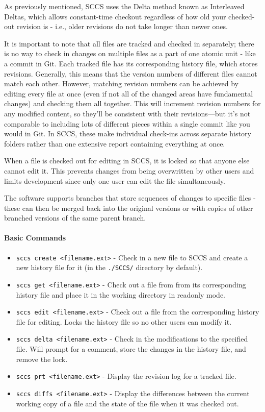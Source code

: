 As previously mentioned, SCCS uses the Delta method known as Interleaved Deltas, which allows constant-time checkout regardless of how old your checked-out revision is - i.e., older revisions do not take longer than newer ones.

It is important to note that all files are tracked and checked in separately; there is no way to check in changes on multiple files as a part of one atomic unit - like a commit in Git. Each tracked file has its corresponding history file, which stores revisions. Generally, this means that the version numbers of different files cannot match each other. However, matching revision numbers can be achieved by editing every file at once (even if not all of the changed areas have fundamental changes) and checking them all together. This will increment revision numbers for any modified content, so they'll be consistent with their revisions—but it's not comparable to including lots of different pieces within a single commit like you would in Git. In SCCS, these make individual check-ins across separate history folders rather than one extensive report containing everything at once.

When a file is checked out for editing in SCCS, it is locked so that anyone else cannot edit it. This prevents changes from being overwritten by other users and limits development since only one user can edit the file simultaneously.

The software supports branches that store sequences of changes to specific files - these can then be merged back into the original versions or with copies of other branched versions of the same parent branch.

\paragraph{Basic Commands}

\begin{itemize}
    \item \lstinline{sccs create <filename.ext>} - Check in a new file to SCCS and create a new history file for it (in the \lstinline{./SCCS/} directory by default).
    \item \lstinline{sccs get <filename.ext>} - Check out a file from from its corresponding history file and place it in the working directory in readonly mode.
    \item \lstinline{sccs edit <filename.ext>} - Check out a file from the corresponding history file for editing. Locks the history file so no other users can modify it.
    \item \lstinline{sccs delta <filename.ext>} - Check in the modifications to the specified file. Will prompt for a comment, store the changes in the history file, and remove the lock.
    \item \lstinline{sccs prt <filename.ext>} - Display the revision log for a tracked file.
    \item \lstinline{sccs diffs <filename.ext>} - Display the differences between the current working copy of a file and the state of the file when it was checked out.
\end{itemize}

